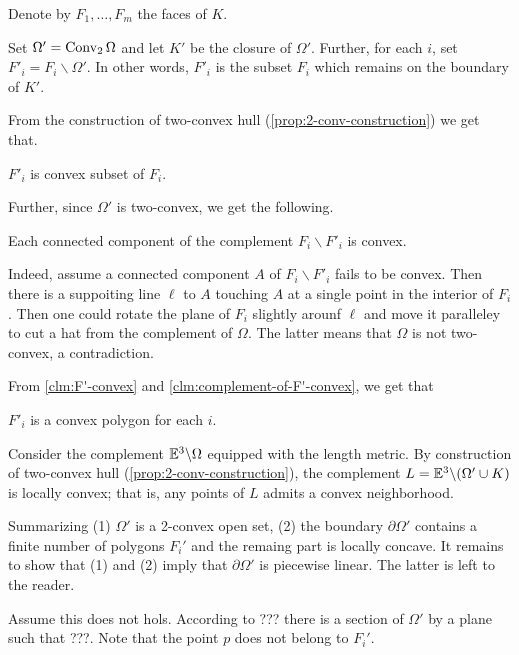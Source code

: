 Denote by $F_1,\dots,F_m$ the faces of $K$.

Set $\Omega'=\mathop{\rm Conv}\nolimits_2\Omega$ and let $K'$ be the closure of $\Omega'$.
Further, 
for each $i$, 
set $F'_i=F_i\backslash \Omega'$.
In other words, 
$F'_i$ is the subset $F_i$ 
which remains on the boundary of $K'$.

From the construction of two-convex hull (\ref{prop:2-conv-construction})
we get that.

\begin{clm}{}\label{clm:F'-convex}
$F'_i$ is convex subset of $F_i$.
\end{clm}

Further, since $\Omega'$ is two-convex,
we get the following.

\begin{clm}{}\label{clm:complement-of-F'-convex}
Each connected component of the complement $F_i\backslash F'_i$ is convex.
\end{clm}

Indeed, assume a connected component $A$ of $F_i\backslash F'_i$ fails to be convex.
Then there is a suppoiting line $\ell$ to $A$ touching $A$ at a single point in the interior of $F_i$.
Then one could rotate the plane of $F_i$ slightly arounf $\ell$ and move it paralleley to cut a hat from the complement of $\Omega$.
The latter means that $\Omega$ is not two-convex, 
a contradiction.
\claimqeds

From \ref{clm:F'-convex} and \ref{clm:complement-of-F'-convex}, we get that 

\begin{clm}{}$F'_i$ is a convex polygon for each $i$.
\end{clm}

Consider the complement 
$\mathbb{E}^3\backslash \Omega$ 
equipped with the length metric.
By construction of two-convex hull (\ref{prop:2-conv-construction}), 
the complement $L=\EE^3\backslash (\Omega'\cup K)$
is locally convex;
that is, any points of $L$ admits a convex neighborhood.

Summarizing (1)
$\Omega'$ is a 2-convex open set,
(2) the boundary $\partial\Omega'$ 
contains a finite number of polygons $F_i'$
and the remaing part is locally concave.
It remains to show that (1) and (2) imply that $\partial\Omega'$
is piecewise linear.
The latter is left to the reader.

Assume this does not hols. 
According to ??? there is a section of $\Omega'$ by a plane such that ???.
Note that the point $p$ does not belong to $F_i'$.




